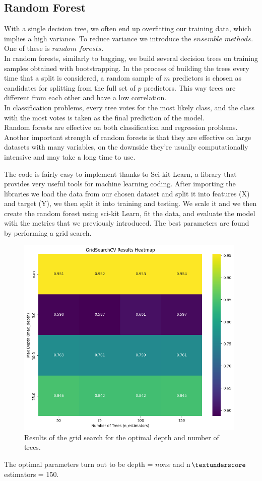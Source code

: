 \documentclass[letterpaper,12pt]{article}
\begin{document}
\subsection{Random Forest}
\par With a single decision tree, we often end up overfitting our training data, which implies a high variance. To reduce variance we introduce the $ensemble$ $methods$. One of these is $random$ $forests$.\\
In random forests, similarly to bagging, we build several decision trees on training samples obtained with bootstrapping. In the process of building the trees every time that a split is considered, a random sample of $m$ predictors is chosen as candidates for splitting from the full set of $p$ predictors. This way trees are different from each other and have a low correlation.\\
In classification problems, every tree votes for the most likely class, and the class with the most votes is taken as the final prediction of the model.\\
Random forests are effective on both classification and regression problems. Another important strength of random forests is that they are effective on large datasets with many variables, on the downside they're usually computationally intensive and may take a long time to use.\\
\par The code is fairly easy to implement thanks to Sci-kit Learn, a library that provides very useful tools for machine learning coding. After importing the libraries we load the data from our chosen dataset and split it into features (X) and target (Y), we then split it into training and testing. We scale it and we then create the random forest using sci-kit Learn, fit the data, and evaluate the model with the metrics that we previously introduced. The best parameters are found by performing a grid search.
\begin{figure}[H]
    \centering
    \includegraphics[width=11cm]{GSearch.png}
    \caption{\centering Results of the grid search for the optimal depth and number of trees.}
    \label{cross}
\end{figure}
The optimal parameters turn out to be depth = $none$ and n$\textunderscore$estimators = 150.
\end{document}
